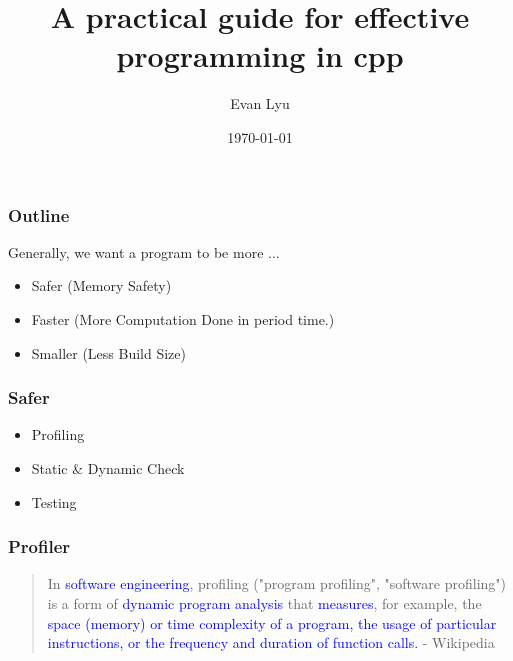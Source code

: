 \documentclass{beamer}
\title{A practical guide for effective programming in cpp}
\author{Evan Lyu}
\date{\today}
\begin{document}
\frame{\titlepage}

\begin{frame}
\frametitle{Outline}
 Generally, we want a program to be more ...
     \setlength\itemsep{1em}
  \begin{itemize}
     \setlength\itemsep{1em}
     \item Safer (Memory Safety)
     \item Faster (More Computation Done in period time.)
     \item Smaller (Less Build Size)
   \end{itemize}
\end{frame}

\begin{frame}
\frametitle{Safer}
 \begin{itemize}
     \setlength\itemsep{1em}
     \item Profiling
     \item Static \& Dynamic Check
     \item Testing
 \end{itemize}
\end{frame}

\begin{frame}
\frametitle{Profiler}
\vspace*{\fill}
\begin{quote}
\centering
In \textcolor{blue} {software engineering}, profiling ("program profiling", "software profiling") is a form of \textcolor{blue}{dynamic program analysis} that \textcolor{blue}{measures}, for example, the \textcolor{blue}{space (memory) or time complexity of a program, the usage of particular instructions, or the frequency and duration of function calls.}  - Wikipedia
\end{quote}
\vspace*{\fill}
\end{frame}
\end{document}
